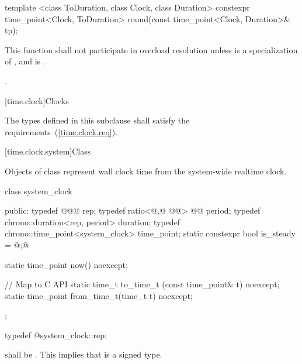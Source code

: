%
%
\begin{itemdecl}
template <class ToDuration, class Clock, class Duration>
  constexpr time_point<Clock, ToDuration>
  round(const time_point<Clock, Duration>& tp);
\end{itemdecl}

\begin{itemdescr}
\pnum
\remarks This function shall not participate in overload resolution
unless  is a specialization of , and
 is .

\pnum
\returns {}.
\end{itemdescr}

[time.clock]{Clocks}

\pnum
The types defined in this subclause shall satisfy the
requirements~(\ref{time.clock.req}).

[time.clock.system]{Class }

\pnum
Objects of class  represent wall clock time from the system-wide
realtime clock.

\begin{codeblock}
class system_clock {
public:
  typedef @\seebelow@                     @\itcorr[-1]@   rep;
  typedef ratio<@\unspecnc,@ @\unspec{}@> @\itcorr[-1]@ period;
  typedef chrono::duration<rep, period>    duration;
  typedef chrono::time_point<system_clock> time_point;
  static constexpr bool is_steady =        @\unspec;@

  static time_point now() noexcept;

  // Map to C API
  static time_t      to_time_t  (const time_point& t) noexcept;
  static time_point  from_time_t(time_t t) noexcept;
};
\end{codeblock}

%
%
\begin{itemdecl}
typedef @\unspec@ system_clock::rep;
\end{itemdecl}

\begin{itemdescr}
\pnum
\requires {} shall
be . \enternote This implies that  is a signed type. \exitnote
\end{itemdescr}

